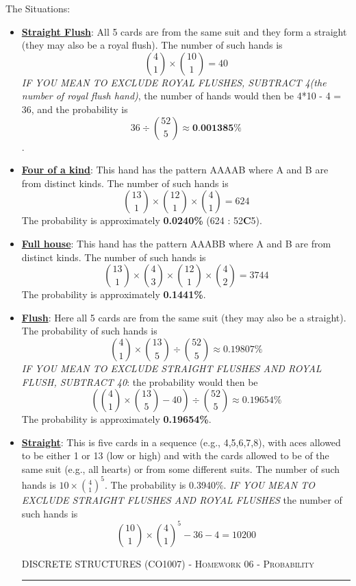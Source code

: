 \documentclass[12pt]{amsart}
\begin{document}
The Situations:
\begin{itemize}
    \item \textbf{\underline{Straight Flush}}: All 5 cards are from the same suit and they form a straight (they may also be a royal flush). The number of such hands is \[\binom{4}{1}\times\binom{10}{1}=40\] \emph{IF YOU MEAN TO EXCLUDE ROYAL FLUSHES, SUBTRACT 4(the number of royal flush hand)}, the number of hands would then be 4*10 - 4 = 36, and the probability is \[36\div\binom{52}{5} \approx \textbf{0.001385\%}\].
    \item \textbf{\underline{Four of a kind}}: This hand has the pattern AAAAB where A and B are from distinct kinds. The number of such hands is \[\binom{13}{1}\times\binom{12}{1}\times\binom{4}{1}=624\] The probability is approximately \textbf{0.0240\%} (624 : 52\textbf{C}5).
    \item \textbf{\underline{Full house}}: This hand has the pattern AAABB where A and B are from distinct kinds. The number of such hands is \[\binom{13}{1}\times\binom{4}{3}\times\binom{12}{1}\times\binom{4}{2}=3744\]The probability is approximately \textbf{0.1441\%}.
    \item \textbf{\underline{Flush}}: Here all 5 cards are from the same suit (they may also be a straight). The probability of such hands is \[\binom{4}{1}\times\binom{13}{5}\div\binom{52}{5}\approx0.19807\%\] \emph{IF YOU MEAN TO EXCLUDE STRAIGHT FLUSHES AND ROYAL FLUSH, SUBTRACT 40}: the probability would then be \[\left(\binom{4}{1}\times\binom{13}{5}-40\right)\div\binom{52}{5}\approx0.19654\%\] The probability is approximately \textbf{0.19654\%}.
    \item \textbf{\underline{Straight}}: This is five cards in a sequence (e.g., 4,5,6,7,8), with aces allowed to be either 1 or 13 (low or high) and with the cards allowed to be of the same suit (e.g., all hearts) or from some different suits. The number of such hands is $10\times\binom{4}{1}^5$. The probability is 0.3940\%. \emph{IF YOU MEAN TO EXCLUDE STRAIGHT FLUSHES AND ROYAL FLUSHES} the number of such hands is \[\binom{10}{1}\times\binom{4}{1}^5 - 36 - 4 = 10 200\]
    \newpage

{\scshape } \hfill {\scshape DISCRETE STRUCTURES (CO1007) - Homework 06 - Probability} \hfill {\scshape }
 
\smallskip

\hrule

\bigskip


\end{itemize}
\end{document}
